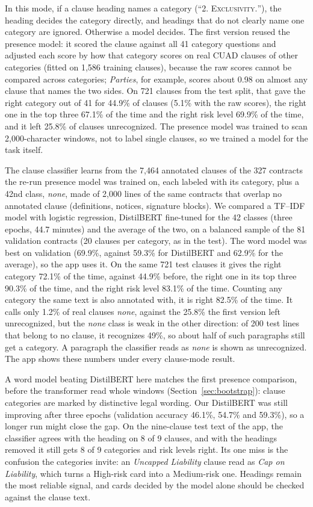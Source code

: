 In this mode, if a clause heading names a category (``\textsc{2. Exclusivity.}''), the heading decides the category directly, and headings that do not clearly name one category are ignored. Otherwise a model decides. The first version reused the presence model: it scored the clause against all 41 category questions and adjusted each score by how that category scores on real CUAD clauses of other categories (fitted on 1{,}586 training clauses), because the raw scores cannot be compared across categories; \emph{Parties}, for example, scores about 0.98 on almost any clause that names the two sides. On 721 clauses from the test split, that gave the right category out of 41 for 44.9\% of clauses (5.1\% with the raw scores), the right one in the top three 67.1\% of the time and the right risk level 69.9\% of the time, and it left 25.8\% of clauses unrecognized. The presence model was trained to scan 2{,}000-character windows, not to label single clauses, so we trained a model for the task itself.

The clause classifier learns from the 7{,}464 annotated clauses of the 327 contracts the re-run presence model was trained on, each labeled with its category, plus a 42nd class, \emph{none}, made of 2{,}000 lines of the same contracts that overlap no annotated clause (definitions, notices, signature blocks). We compared a TF--IDF model with logistic regression, DistilBERT fine-tuned for the 42 classes (three epochs, 44.7 minutes) and the average of the two, on a balanced sample of the 81 validation contracts (20 clauses per category, as in the test). The word model was best on validation (69.9\%, against 59.3\% for DistilBERT and 62.9\% for the average), so the app uses it. On the same 721 test clauses it gives the right category 72.1\% of the time, against 44.9\% before, the right one in its top three 90.3\% of the time, and the right risk level 83.1\% of the time. Counting any category the same text is also annotated with, it is right 82.5\% of the time. It calls only 1.2\% of real clauses \emph{none}, against the 25.8\% the first version left unrecognized, but the \emph{none} class is weak in the other direction: of 200 test lines that belong to no clause, it recognizes 49\%, so about half of such paragraphs still get a category. A paragraph the classifier reads as \emph{none} is shown as unrecognized. The app shows these numbers under every clause-mode result.

A word model beating DistilBERT here matches the first presence comparison, before the transformer read whole windows (Section~\ref{sec:bootstrap}): clause categories are marked by distinctive legal wording. Our DistilBERT was still improving after three epochs (validation accuracy 46.1\%, 54.7\% and 59.3\%), so a longer run might close the gap. On the nine-clause test text of the app, the classifier agrees with the heading on 8 of 9 clauses, and with the headings removed it still gets 8 of 9 categories and risk levels right. Its one miss is the confusion the categories invite: an \emph{Uncapped Liability} clause read as \emph{Cap on Liability}, which turns a High-risk card into a Medium-risk one. Headings remain the most reliable signal, and cards decided by the model alone should be checked against the clause text.

